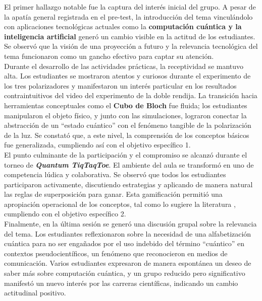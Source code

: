 \documentclass[10pt,a4paper]{article}
\begin{document}
El primer hallazgo notable fue la captura del interés inicial del grupo. A pesar de la apatía general registrada en el pre-test, la introducción del tema vinculándolo con aplicaciones tecnológicas actuales como la \textbf{computación cuántica y la inteligencia artificial} generó un cambio visible en la actitud de los estudiantes. Se observó que la visión de una proyección a futuro y la relevancia tecnológica del tema funcionaron como un gancho efectivo para captar su atención.\\
\vspace{1em}
Durante el desarrollo de las actividades prácticas, la receptividad se mantuvo alta. Los estudiantes se mostraron atentos y curiosos durante el experimento de los tres polarizadores y manifestaron un interés particular en los resultados contraintuitivos del video del experimento de la doble rendija. La transición hacia herramientas conceptuales como el \textbf{Cubo de Bloch} fue fluida; los estudiantes manipularon el objeto físico, y junto con las simulaciones, lograron conectar la abstracción de un ``estado cuántico'' con el fenómeno tangible de la polarización de la luz. Se constató que, a este nivel, la comprensión de los conceptos básicos fue generalizada, cumpliendo así con el objetivo específico 1.\\
\vspace{1em}
El punto culminante de la participación y el compromiso se alcanzó durante el torneo de \textbf{\textit{Quantum TiqTaqToe}}. El ambiente del aula se transformó en uno de competencia lúdica y colaborativa. Se observó que todos los estudiantes participaron activamente, discutiendo estrategias y aplicando de manera natural las reglas de superposición para ganar. Esta gamificación permitió una apropiación operacional de los conceptos, tal como lo sugiere la literatura \cite{GamesForTeaching2022}, cumpliendo con el objetivo específico 2.\\
\vspace{1em}
Finalmente, en la última sesión se generó una discusión grupal sobre la relevancia del tema. Los estudiantes reflexionaron sobre la necesidad de una alfabetización cuántica para no ser engañados por el uso indebido del término ``cuántico'' en contextos pseudocientíficos, un fenómeno que reconocieron en medios de comunicación. Varios estudiantes expresaron de manera espontánea un deseo de saber más sobre computación cuántica, y un grupo reducido pero significativo manifestó un nuevo interés por las carreras científicas, indicando un cambio actitudinal positivo.
\end{document}
